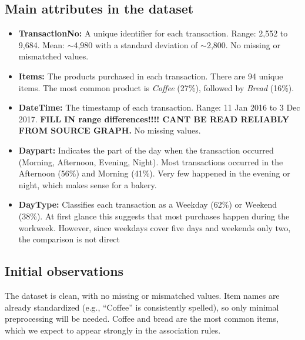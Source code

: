 \subsection*{Main attributes in the dataset}
\begin{itemize}
    \item \textbf{TransactionNo:} A unique identifier for each transaction.  
    Range: 2,552 to 9,684.  
    Mean: $\sim$4,980 with a standard deviation of $\sim$2,800.  
    No missing or mismatched values.  

    \item \textbf{Items:} The products purchased in each transaction.  
    There are 94 unique items.  
    The most common product is \textit{Coffee} (27\%), followed by \textit{Bread} (16\%).  

    \item \textbf{DateTime:} The timestamp of each transaction.  
    Range: 11 Jan 2016 to 3 Dec 2017.  
    \textbf{FILL IN range differences!!!! CANT BE READ RELIABLY FROM SOURCE GRAPH.}
    No missing values.  

    \item \textbf{Daypart:} Indicates the part of the day when the transaction occurred (Morning, Afternoon, Evening, Night).  
    Most transactions occurred in the Afternoon (56\%) and Morning (41\%).  
    Very few happened in the evening or night, which makes sense for a bakery.  

    \item \textbf{DayType:} Classifies each transaction as a Weekday (62\%) or Weekend (38\%).  
    At first glance this suggests that most purchases happen during the workweek. 
    However, since weekdays cover five days and weekends only two, the comparison is not direct

\end{itemize}

\subsection*{Initial observations}
The dataset is clean, with no missing or mismatched values.  
Item names are already standardized (e.g., ``Coffee'' is consistently spelled), 
so only minimal preprocessing will be needed.  
Coffee and bread are the most common items, 
which we expect to appear strongly in the association rules.  

